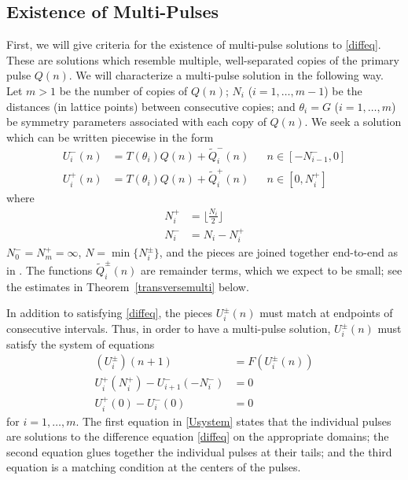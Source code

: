 \documentclass[12pt]{article}
\begin{document}
\subsection{Existence of Multi-Pulses}

First, we will give criteria for the existence of multi-pulse solutions to \eqref{diffeq}. These are solutions which resemble multiple, well-separated copies of the primary pulse $Q(n)$. We will characterize a multi-pulse solution in the following way. Let $m > 1$ be the number of copies of $Q(n)$; $N_i$ ($i = 1, \dots, m-1$) be the distances (in lattice points) between consecutive copies; and $\theta_i = G$ ($i = 1, \dots, m$) be symmetry parameters associated with each copy of $Q(n)$. We seek a solution which can be written piecewise in the form 
\begin{align}\label{Upiecewise}
U_i^-(n) &= T(\theta_i) Q(n) + \tilde{Q}_i^-(n) && n \in [-N_{i-1}^-, 0] \\
U_i^+(n) &= T(\theta_i) Q(n) + \tilde{Q}_i^+(n) && n \in [0, N_i^+]
\nonumber
\end{align}
where 
\begin{equation}\label{Nipm}
\begin{aligned}
N_i^+ &= \lfloor \frac{N_i}{2} \rfloor \\
N_i^- &= N_i - N_i^+
\end{aligned}
\end{equation}
$N_0^- = N_m^+ = \infty$, $N = \min\{ N_i^\pm \}$, and the pieces are joined together end-to-end as in \cite{Sandstede1998}. The functions $\tilde{Q}_i^\pm(n)$ are remainder terms, which we expect to be small; see the estimates in Theorem~\ref{transversemulti} below.

In addition to satisfying \eqref{diffeq}, the pieces $U_i^\pm(n)$ must match at endpoints of consecutive intervals. Thus, in order to have a multi-pulse solution, $U_i^\pm(n)$ must satisfy the system of equations
\begin{equation}\label{Usystem}
\begin{aligned}
(U_i^\pm)(n+1) &= F(U_i^\pm(n))  \\
U_i^+(N_i^+) - U_{i+1}^-(-N_i^-) &= 0 \\
U_i^+(0) - U_i^-(0) &= 0
\end{aligned}
\end{equation}
for $i = 1, \dots, m$. The first equation in \eqref{Usystem} states that the individual pulses are solutions to the difference equation \eqref{diffeq} on the appropriate domains; the second equation glues together the individual pulses at their tails; and the third equation is a matching condition at the centers of the pulses.
\end{document}
